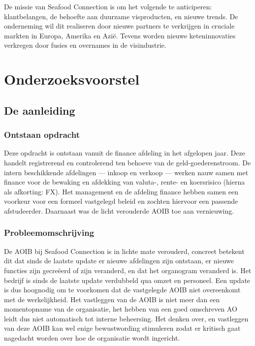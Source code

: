 \documentclass[10pt,a4paper,twoside]{report}
\begin{document}
De missie van Seafood Connection is om het volgende te anticiperen: klantbelangen, de behoefte aan duurzame visproducten, en nieuwe trends. De onderneming wil dit realiseren door nieuwe partners te verkrijgen in cruciale markten in Europa, Amerika en Azië. Tevens worden nieuwe keteninnovaties verkregen door fusies en overnames in de visindustrie. \citep{sfcwebsite}

\chapter{Onderzoeksvoorstel}
    \section{De aanleiding}

\subsection{Ontstaan opdracht}
Deze opdracht is ontstaan vanuit de finance afdeling in het afgelopen jaar. Deze handelt registrerend en controlerend ten behoeve van de geld-goederenstroom. De intern beschikkende afdelingen –-- inkoop en verkoop --– werken nauw samen met finance voor de bewaking en afdekking van valuta-, rente- en koersrisico (hierna als afkorting: FX). Het management en de afdeling finance hebben samen een voorkeur voor een formeel vastgelegd beleid en zochten hiervoor een passende afstudeerder. Daarnaast was de licht verouderde AOIB toe aan vernieuwing.

\subsection{Probleemomschrijving} \label{beschr:problemen}
De AOIB bij Seafood Connection is in lichte mate verouderd, concreet betekent dit dat sinds de laatste update er nieuwe afdelingen zijn ontstaan, er nieuwe functies zijn gecreëerd of zijn veranderd, en dat het organogram veranderd is. Het bedrijf is sinds de laatste update verdubbeld qua omzet en personeel. Een update is dus hoognodig om te voorkomen dat de vastgelegde AOIB niet overeenkomt met de werkelijkheid. 
Het vastleggen van de AOIB is niet meer dan een momentopname van de organisatie, het hebben van een goed omschreven AO leidt dus niet automatisch tot interne beheersing. Het denken over, en vastleggen van deze AOIB kan wel enige bewustwording stimuleren zodat er kritisch gaat nagedacht worden over hoe de organisatie wordt ingericht. \citep{bivpraktijk}
\end{document}
